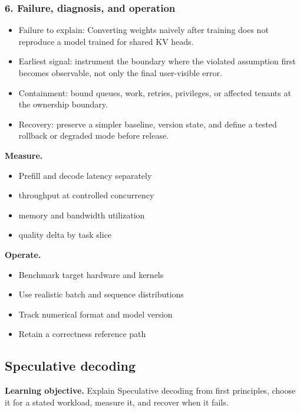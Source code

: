 \subsubsection*{6. Failure, diagnosis, and operation}
\begin{itemize}
\item Failure to explain: Converting weights naively after training does not reproduce a model trained for shared KV heads.
\item Earliest signal: instrument the boundary where the violated assumption first becomes observable, not only the final user-visible error.
\item Containment: bound queues, work, retries, privileges, or affected tenants at the ownership boundary.
\item Recovery: preserve a simpler baseline, version state, and define a tested rollback or degraded mode before release.
\end{itemize}
\textbf{Measure.}\begin{itemize}
\item Prefill and decode latency separately
\item throughput at controlled concurrency
\item memory and bandwidth utilization
\item quality delta by task slice
\end{itemize}
\textbf{Operate.}\begin{itemize}
\item Benchmark target hardware and kernels
\item Use realistic batch and sequence distributions
\item Track numerical format and model version
\item Retain a correctness reference path
\end{itemize}
\subsection{Speculative decoding}
\textbf{Learning objective.} Explain Speculative decoding from first principles, choose it for a stated workload, measure it, and recover when it fails.
